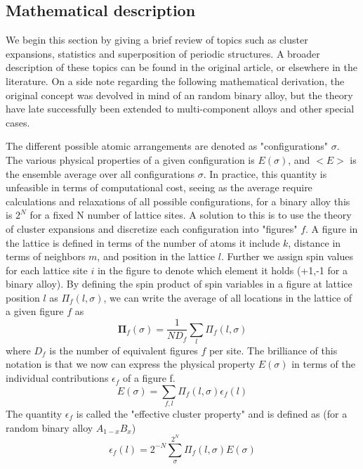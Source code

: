 \subsection{Mathematical description}
We begin this section by giving a brief review of topics such as cluster expansions, statistics and superposition of periodic structures. A broader description of these topics can be found in the original article, or elsewhere in the literature. On a side note regarding the following mathematical derivation, the original concept was devolved in mind of an random binary alloy, but the theory have late successfully been extended to multi-component alloys and other special cases. 

The different possible atomic arrangements are denoted as "configurations" $\sigma$. The various physical properties of a given configuration is $E(\sigma)$, and $<E>$ is the ensemble average over all configurations $\sigma$. In practice, this quantity is unfeasible in terms of computational cost, seeing as the average require calculations and relaxations of all possible configurations, for a binary alloy this is $2^N$ for a fixed N number of lattice sites. A solution to this is to use the theory of cluster expansions and discretize each configuration into "figures" $f$. A figure in the lattice is defined in terms of the number of atoms it include $k$, distance in terms of neighbors $m$, and position in the lattice $l$. Further we assign spin values for each lattice site $i$ in the figure to denote which element it holds (+1,-1 for a binary alloy). By defining the spin product of spin variables in a figure at lattice position $l$ as $\Pi_f(l, \sigma)$, we can write the average of all locations in the lattice of a given figure $f$ as 
\begin{equation}
    \boldsymbol{\Pi}_f(\sigma) = \frac{1}{ND_f} \sum_l \Pi_f (l,\sigma)
\end{equation}
where $D_f$ is the number of equivalent figures $f$ per site. The brilliance of this notation is that we now can express the physical property $E(\sigma)$ in terms of the individual contributions $\epsilon_f$ of a figure f.
\begin{equation}
    E(\sigma) = \sum_{f,l} \Pi_f(l, \sigma) \epsilon_f(l)
\end{equation}
The quantity $\epsilon_f$ is called the "effective cluster property" and is defined as (for a random binary alloy $A_{1-x}B_x$)
\begin{equation}
    \epsilon_f(l) = 2^{-N}\sum_\sigma^{2^N} \Pi_f (l,\sigma) E(\sigma)
\end{equation}
